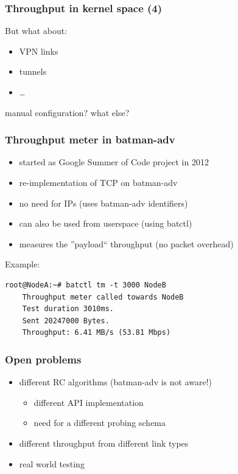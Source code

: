 \documentclass[slidestop]{beamer}
\begin{document}
\begin{frame}
	\frametitle{Throughput in kernel space (4)}
	But what about:
	\begin{itemize}
	\item VPN links
	\item tunnels
	\item \dots
	\end{itemize}
	manual configuration? what else?
\end{frame}

\begin{frame}[c,fragile]
	\frametitle{Throughput meter in batman-adv}
	\begin{itemize}
		\item started as Google Summer of Code project in 2012
		\item re-implementation of TCP on batman-adv
		\item no need for IPs (uses batman-adv identifiers)
		\item can also be used from userspace (using batctl)
		\item measures the ''payload`` throughput (no packet overhead)
	\end{itemize}
	\addvspace{0.5cm}
	Example:\\
	\begin{lstlisting}[basicstyle=\scriptsize]
	root@NodeA:~# batctl tm -t 3000 NodeB
	Throughput meter called towards NodeB
	Test duration 3010ms.
	Sent 20247000 Bytes.
	Throughput: 6.41 MB/s (53.81 Mbps)
	\end{lstlisting}
\end{frame}

\begin{frame}[c]
	\frametitle{Open problems}
	\begin{itemize}
		\item different RC algorithms (batman-adv is not aware!)
		\begin{itemize}
			\item different API implementation
			\item need for a different probing schema
		\end{itemize}
		\item different throughput from different link types
		\item real world testing
	\end{itemize}
\end{frame}
\end{document}
